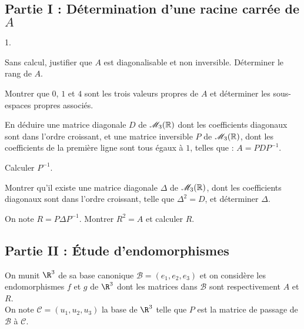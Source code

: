 \documentclass[11pt]{article}%
\begin{document}
\subsection*{Partie I : Détermination d'une racine carrée de $A$}

\begin{noliste}{1.}
 \setlength{\itemsep}{4mm}
\item Sans calcul, justifier que $A$ est diagonalisable et non
inversible.
Déterminer le rang de $A$.

\item Montrer que $0$, $1$ et $4$ sont les trois valeurs propres de $A$
et
déterminer les sous-espaces propres associés.

\item En déduire une matrice diagonale $D$ de $\mathscr{M}_{3}(\mathbb{R}) $ dont les
coefficients diagonaux sont dans l'ordre
croissant, et une matrice inversible $P$ de $\mathscr{M}_{3}(\mathbb{R}) $, dont les
coefficients de la première ligne sont tous
égaux à $1$, telles que : $A = PDP^{-1}.$

\item Calculer $P^{-1}$.

\item Montrer qu'il existe une matrice diagonale $\Delta$ de $\mathscr{M}_{3}(\mathbb{R}) $,
dont les coefficients diagonaux sont dans
l'ordre croissant, telle que $\Delta^{2} = D$, et déterminer $\Delta$.

\item On note $R = P\Delta P^{-1}$. Montrer $R^{2} = A$ et calculer
$R$.
\end{noliste}

\subsection*{Partie II : Étude d'endomorphismes}

\noindent
On munit $\R^{3}$ de sa base canonique $\mathcal{B = }\left(
e_{1},e_{2},e_{3}\right) $ et on considère les endomorphismes $f$ et
$g$ de $\R^{3}$ dont les matrices dans $\mathcal{B}$ sont respectivement
$A$ et $R$.\\
On note $\mathcal{C = }\left( u_{1},u_{2},u_{3}\right) $ la base de
$\R^{3}$ telle que $P$ est la matrice de passage de $\mathcal{B}$
à $\mathcal{C}$.
\end{document}
